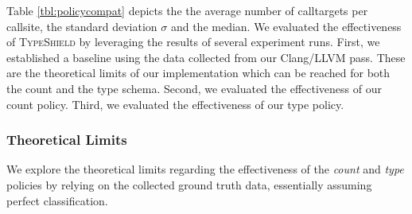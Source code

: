 \begin{table*}[htbp!]
\begin{center}
{\begin{tabular}{l|r|rcl|r|rcl|r|rcl|r|rcl|r}
    	\end{tabular}

}
	\caption {Results for allowed callsites per calltarget for several programs compiled with 
	Clang using optimization level \texttt{-O2}. Note that the basic restriction to address taken only calltargets (see column AT) is 
	present for each other series. The label $count^*$ denotes the best possible reduction using our \emph{count} policy 
	based on the ground truth collected by our Clang/LLVM pass, while $count$ denotes the results of our implementation of 
	the \emph{count} policy derived from the binaries. The same applies to $type*$ and $type$ regarding the \emph{type} policy. 
	A lower number of calltargets per callsite indicates better results. Note that our \emph{type} policy is superior to 
	the \emph{count} policy, as it allows for a stronger reduction of allowed calltargets. 
	We consider this a good result which further improves the state-of-the-art. 
	Finally, we provide the median and the pair of mean and standard deviation to allow for a 
	better comparison with other state-of-the-art tools.
        }
	\label{tbl:policycompat}
\end{center}
\vspace{-.5cm}
\end{table*}
Table \ref{tbl:policycompat} depicts the the average number of calltargets per callsite, the standard deviation $\sigma$ and the median. 
We evaluated the effectiveness of \textsc{TypeShield} by leveraging the results of several experiment runs.
First, we established a baseline using the data collected from our Clang/LLVM pass. These are the theoretical limits of our implementation which can be reached for both the {count} and the {type} schema. 
Second, we evaluated the effectiveness of our {count} policy. Third, we evaluated the effectiveness of our {type} policy. 

\subsubsection{Theoretical Limits}
\label{subsection:theoreticallimit}
We explore the theoretical limits regarding the effectiveness of the \textit{count} and \textit{type} policies by relying on the collected ground truth data, essentially assuming perfect classification.

